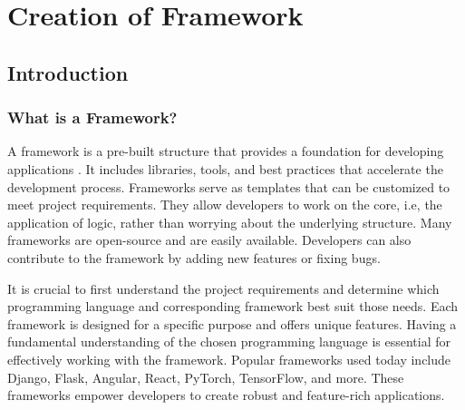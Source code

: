 \chapter{Creation of Framework}
\section{Introduction}
\subsection{What is a Framework?}
A framework is a pre-built structure that provides a foundation for developing applications \cite{framework}. It includes libraries, tools, and best practices that accelerate 
the development process. Frameworks serve as templates that can be customized to meet project requirements. They allow developers to work on the core, i.e,
the application of logic, rather than worrying about the underlying structure. Many frameworks are open-source and are easily available. Developers can also
contribute to the framework by adding new features or fixing bugs.

It is crucial to first understand the project requirements and determine which programming language and corresponding framework best suit those needs. 
Each framework is designed for a specific purpose and offers unique features. Having a fundamental understanding of the chosen programming language is 
essential for effectively working with the framework. Popular frameworks used today include Django, Flask, Angular, React, PyTorch, TensorFlow, and more. 
These frameworks empower developers to create robust and feature-rich applications.

